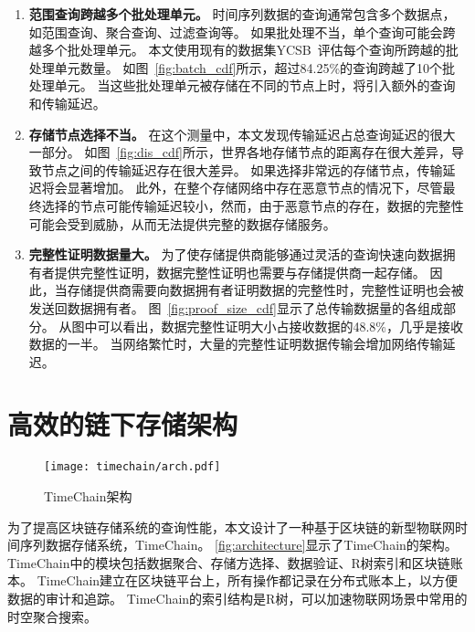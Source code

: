 \begin{enumerate}
    \item \textbf{范围查询跨越多个批处理单元。}
    时间序列数据的查询通常包含多个数据点，如范围查询、聚合查询、过滤查询等。
    如果批处理不当，单个查询可能会跨越多个批处理单元。
    本文使用现有的数据集YCSB~\cite{barata2014ycsb}评估每个查询所跨越的批处理单元数量。
    如图~\autoref{fig:batch_cdf}所示，超过84.25\%的查询跨越了10个批处理单元。
    当这些批处理单元被存储在不同的节点上时，将引入额外的查询和传输延迟。

    \item \textbf{存储节点选择不当。}
    在这个测量中，本文发现传输延迟占总查询延迟的很大一部分。
    如图~\autoref{fig:dis_cdf}所示，世界各地存储节点的距离存在很大差异，导致节点之间的传输延迟存在很大差异。
    如果选择非常远的存储节点，传输延迟将会显著增加。
    此外，在整个存储网络中存在恶意节点的情况下，尽管最终选择的节点可能传输延迟较小，然而，由于恶意节点的存在，数据的完整性可能会受到威胁，从而无法提供完整的数据存储服务。

    \item \textbf{完整性证明数据量大。}
    为了使存储提供商能够通过灵活的查询快速向数据拥有者提供完整性证明，数据完整性证明也需要与存储提供商一起存储。
    因此，当存储提供商需要向数据拥有者证明数据的完整性时，完整性证明也会被发送回数据拥有者。
    图~\autoref{fig:proof_size_cdf}显示了总传输数据量的各组成部分。
    从图中可以看出，数据完整性证明大小占接收数据的48.8\%，几乎是接收数据的一半。
    当网络繁忙时，大量的完整性证明数据传输会增加网络传输延迟。
\end{enumerate}

\section{高效的链下存储架构}
\label{sec:design}

\begin{figure}[t]
    \centering
    \texttt{[image: timechain/arch.pdf]}
    \caption{TimeChain架构}
    \label{fig:architecture}
\end{figure}

为了提高区块链存储系统的查询性能，本文设计了一种基于区块链的新型物联网时间序列数据存储系统，TimeChain。
\autoref{fig:architecture}显示了TimeChain的架构。
TimeChain中的模块包括数据聚合、存储方选择、数据验证、R树索引和区块链账本。
TimeChain建立在区块链平台上，所有操作都记录在分布式账本上，以方便数据的审计和追踪。
TimeChain的索引结构是R树，可以加速物联网场景中常用的时空聚合搜索。


